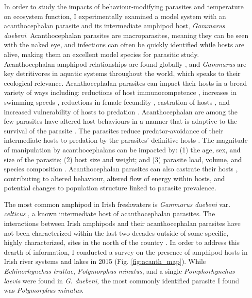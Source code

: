 In order to study the impacts of behaviour-modifying parasites and temperature on ecosystem function, I experimentally examined a model system with an acanthocephalan parasite and its intermediate amphipod host, \emph{Gammarus duebeni}. Acanthocephalan parasites are macroparasites, meaning they can be seen with the naked eye, and infections can often be quickly identified while hosts are alive, making them an excellent model species for parasitic study. Acanthocephalan-amphipod relationships are found globally \citep{hynes1958, tokeson1982}, and \emph{Gammarus} are key detritivores in aquatic systems throughout the world, which speaks to their ecological relevance. Acanthocephalan parasites can impact their hosts in a broad variety of ways including: reductions of host immunocompetence \citep{rigaud2003},  increases in swimming speeds \citep{medoc2008}, reductions in female fecundity \citep{dezfuli1999}, castration of hosts \citep{bailly2017},  and increased vulnerability of hosts  to predation \citep{lagrue2007}. Acanthocephalan are among the few parasites have altered host behaviours in a manner that is adaptive to the survival of the parasite \citep{poulin1995}. The parasites reduce predator-avoidance of their intermediate hosts to predation by the parasites’ definitive hosts \citep{jacquin2014}. The magnitude of manipulation by acanthocephalans can be impacted by: (1) the age, sex, and size of the parasite; (2) host size and weight; and (3) parasite load, volume, and species composition \citep{labaude2015host}. Acanthocephalan parasites can also castrate their hosts \citep{kakizaki2003,bailly2017}, contributing to altered behaviour, altered flow of energy within hosts, and potential changes to population structure linked to parasite prevalence. 

The most common amphipod in Irish freshwaters is \emph{Gammarus duebeni} var. \emph{celticus} \citep{reid1938,macneil2009}, a known intermediate host of acanthocephalan parasites. The interactions between Irish amphipods and their acanthocephalan parasites have not been characterized within the last two decades outside of some specific, highly characterized, sites in the north of the country \citep{dick1993,lyndon1996,dunn1998}. In order to address this dearth of information, I conducted a survey on the presence of amphipod hosts in Irish river systems and lakes in 2015 (Fig. \ref{fig:acanth_map}). While \emph{Echinorhynchus truttae}, \emph{Polymorphus minutus}, and a single \emph{Pomphorhynchus laevis} were found in \emph{G. duebeni}, the most commonly identified parasite I found was \emph{Polymorphus minutus}. 

